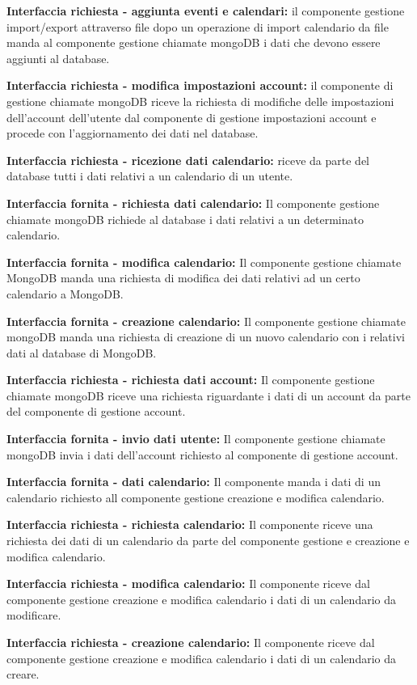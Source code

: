 \begin{listaPersonale}[]{}
    \textbf{Interfaccia richiesta - aggiunta eventi e calendari:} il componente gestione import/export attraverso file dopo un operazione di import calendario da file manda al componente gestione chiamate mongoDB i dati che devono essere aggiunti al database.

    \textbf{Interfaccia richiesta - modifica impostazioni account:} il componente di gestione chiamate mongoDB riceve la richiesta di modifiche delle impostazioni dell'account dell'utente dal componente di gestione impostazioni account e procede con l'aggiornamento dei dati nel database.

    \textbf{Interfaccia richiesta - ricezione dati calendario:} riceve da parte del database tutti i dati relativi a un calendario di un utente.

    \textbf{Interfaccia fornita - richiesta dati calendario:} Il componente gestione chiamate mongoDB richiede al database i dati relativi a un determinato calendario.

    \textbf{Interfaccia fornita - modifica calendario:} Il componente gestione chiamate MongoDB manda una richiesta di modifica dei dati relativi ad un certo calendario a MongoDB.

    \textbf{Interfaccia fornita - creazione calendario:} Il componente gestione chiamate mongoDB manda una richiesta di creazione di un nuovo calendario con i relativi dati al database di MongoDB.

    \textbf{Interfaccia richiesta - richiesta dati account:} Il componente gestione chiamate mongoDB riceve una richiesta riguardante i dati di un account da parte del componente di gestione account.

    \textbf{Interfaccia fornita - invio dati utente:} Il componente gestione chiamate mongoDB invia i dati dell'account richiesto al componente di gestione account.

    \textbf{Interfaccia fornita - dati calendario:} Il componente manda i dati di un calendario richiesto all componente gestione creazione e modifica calendario.

    \textbf{Interfaccia richiesta - richiesta calendario:} Il componente riceve una richiesta dei dati di un calendario da parte del componente gestione e creazione e modifica calendario.

    \textbf{Interfaccia richiesta - modifica calendario:} Il componente riceve dal componente gestione creazione e modifica calendario i dati di un calendario da modificare.

    \textbf{Interfaccia richiesta  - creazione calendario:} Il componente riceve dal componente gestione creazione e modifica calendario i dati di un calendario da creare.


\end{listaPersonale}
